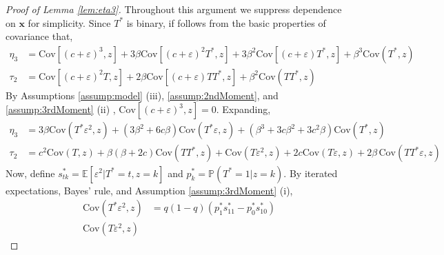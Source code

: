 \begin{proof}[Proof of Lemma \ref{lem:eta3}]
  Throughout this argument we suppress dependence on $\mathbf{x}$ for simplicity.
  Since $T^*$ is binary, if follows from the basic properties of covariance that,
\begin{align*}
  \eta_3 &= \mbox{Cov}\left[ (c + \varepsilon)^3,z \right] + 3 \beta \mbox{Cov}[(c + \varepsilon)^2 T^*, z] + 3 \beta^2 \mbox{Cov}[(c + \varepsilon)T^*,z] + \beta^3 \mbox{Cov}(T^*,z)\\
  \tau_2 &= \mbox{Cov}\left[ (c + \varepsilon)^2 T, z \right] + 2 \beta \mbox{Cov}\left[ (c + \varepsilon)TT^*,z \right] + \beta^2 \mbox{Cov}(TT^*,z)
\end{align*}
By Assumptions \ref{assump:model} (iii), \ref{assump:2ndMoment}, and \ref{assump:3rdMoment} (ii) , $\mbox{Cov}\left[ (c + \varepsilon)^3,z \right] = 0$.
Expanding, 
\begin{align*}
  \eta_3 %
  &= 3 \beta \mbox{Cov}(T^*\varepsilon^2,z) + \left(3 \beta^2 + 6c\beta \right)\mbox{Cov}(T^*\varepsilon,z) + \left( \beta^3 + 3c\beta^2 + 3c^2\beta \right)\mbox{Cov}(T^*, z)\\
  \tau_2 &= c^2 \mbox{Cov}(T,z) + \beta(\beta + 2c) \mbox{Cov}(TT^*,z) + \mbox{Cov}(T\varepsilon^2,z) + 2c \mbox{Cov}(T\varepsilon,z) + 2\beta\,\mbox{Cov}(TT^*\varepsilon,z)
\end{align*}
Now, define $s^*_{tk} = \mathbb{E}[\varepsilon^2|T^*=t, z=k]$ and $p_k^* = \mathbb{P}(T^*=1|z=k)$.
By iterated expectations, Bayes' rule, and Assumption \ref{assump:3rdMoment} (i), 
\begin{align*}
  \mbox{Cov}(T^*\varepsilon^2, z) %
  &= q(1 - q)(p^*_1 s^*_{11} - p^*_0 s^*_{10}) \\
  \mbox{Cov}(T\varepsilon^2, z) %

\end{align*}
\end{proof}

